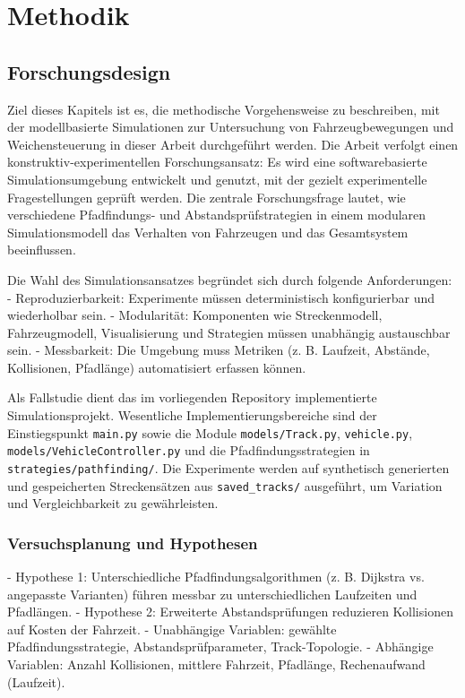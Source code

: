 \chapter{Methodik}
\label{ch:Methodik}

\section{Forschungsdesign}
\label{ch:Methodik:sec:Forschungsdesign}

Ziel dieses Kapitels ist es, die methodische Vorgehensweise zu beschreiben, mit der modellbasierte Simulationen zur Untersuchung von Fahrzeugbewegungen und Weichensteuerung in dieser Arbeit durchgeführt werden. Die Arbeit verfolgt einen konstruktiv-experimentellen Forschungsansatz: Es wird eine softwarebasierte Simulationsumgebung entwickelt und genutzt, mit der gezielt experimentelle Fragestellungen geprüft werden. Die zentrale Forschungsfrage lautet, wie verschiedene Pfadfindungs- und Abstandsprüfstrategien in einem modularen Simulationsmodell das Verhalten von Fahrzeugen und das Gesamtsystem beeinflussen.

Die Wahl des Simulationsansatzes begründet sich durch folgende Anforderungen:
- Reproduzierbarkeit: Experimente müssen deterministisch konfigurierbar und wiederholbar sein.
- Modularität: Komponenten wie Streckenmodell, Fahrzeugmodell, Visualisierung und Strategien müssen unabhängig austauschbar sein.
- Messbarkeit: Die Umgebung muss Metriken (z. B. Laufzeit, Abstände, Kollisionen, Pfadlänge) automatisiert erfassen können.

Als Fallstudie dient das im vorliegenden Repository implementierte Simulationsprojekt. Wesentliche Implementierungsbereiche sind der Einstiegspunkt \texttt{main.py} sowie die Module \texttt{models/Track.py}, \texttt{vehicle.py}, \texttt{models/VehicleController.py} und die Pfadfindungsstrategien in \texttt{strategies/pathfinding/}. Die Experimente werden auf synthetisch generierten und gespeicherten Streckensätzen aus \texttt{saved\_tracks/} ausgeführt, um Variation und Vergleichbarkeit zu gewährleisten.

\subsection*{Versuchsplanung und Hypothesen}
- Hypothese 1: Unterschiedliche Pfadfindungsalgorithmen (z. B. Dijkstra vs. angepasste Varianten) führen messbar zu unterschiedlichen Laufzeiten und Pfadlängen.
- Hypothese 2: Erweiterte Abstandsprüfungen reduzieren Kollisionen auf Kosten der Fahrzeit.
- Unabhängige Variablen: gewählte Pfadfindungsstrategie, Abstandsprüfparameter, Track-Topologie.
- Abhängige Variablen: Anzahl Kollisionen, mittlere Fahrzeit, Pfadlänge, Rechenaufwand (Laufzeit).

